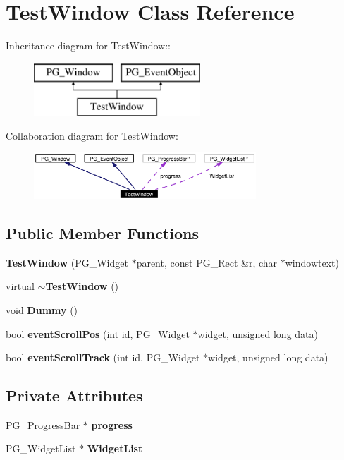 \section{Test\-Window Class Reference}
\label{classTestWindow}
Inheritance diagram for Test\-Window::\begin{figure}[H]
\begin{center}
\leavevmode
\includegraphics[height=2cm]{classTestWindow}
\end{center}
\end{figure}
Collaboration diagram for Test\-Window:\begin{figure}[H]
\begin{center}
\leavevmode
\includegraphics[width=236pt]{classTestWindow__coll__graph}
\end{center}
\end{figure}
\subsection*{Public Member Functions}
\begin{CompactItemize}
\item 
{\bf Test\-Window} (PG\_\-Widget $\ast$parent, const PG\_\-Rect \&r, char $\ast$windowtext)
\item 
virtual {\bf $\sim$Test\-Window} ()
\item 
void {\bf Dummy} ()
\item 
bool {\bf event\-Scroll\-Pos} (int id, PG\_\-Widget $\ast$widget, unsigned long data)
\item 
bool {\bf event\-Scroll\-Track} (int id, PG\_\-Widget $\ast$widget, unsigned long data)
\end{CompactItemize}
\subsection*{Private Attributes}
\begin{CompactItemize}
\item 
PG\_\-Progress\-Bar $\ast$ {\bf progress}
\item 
PG\_\-Widget\-List $\ast$ {\bf Widget\-List}
\end{CompactItemize}


